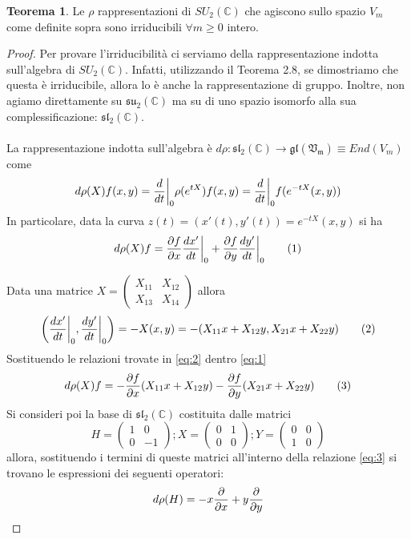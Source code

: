 \documentclass[12pt,a4paper]{report}
\theoremstyle{definition}
\newtheorem{Theo}[Def]{Teorema}
\theoremstyle{definition}
\theoremstyle{definition}
\theoremstyle{remark}
\begin{document}
\begin{Theo} \label{Theo1}
	Le $\rho$ rappresentazioni di $SU_2(\mathbb{C})$ che agiscono sullo spazio $V_m$ come definite sopra sono irriducibili $\forall m\geq 0$ intero.
\end{Theo}
\begin{proof}
	Per provare l'irriducibilità ci serviamo della rappresentazione indotta sull'algebra di $SU_2(\mathbb{C})$. Infatti, utilizzando il Teorema 2.8, se dimostriamo che questa è irriducibile, allora lo è anche la rappresentazione di gruppo. Inoltre, non agiamo direttamente su $\mathfrak{su_2(\mathbb{C})}$ ma su di uno spazio isomorfo alla sua complessificazione: $\mathfrak{sl_2(\mathbb{C})}$.\\
	\\
	La rappresentazione indotta sull'algebra è $d\rho:\mathfrak{sl_2(\mathbb{C})}\rightarrow \mathfrak{gl(V_m)}\equiv End(V_m)$ come 
	$$d\rho(X)f(x,y)={d\over dt}\bigg{\rvert}_{0}\rho(e^{tX})f(x,y)={d\over dt}\bigg{\rvert}_{0}f(e^{-tX}(x,y))$$
	In particolare, data la curva $z(t)=(x'(t),y'(t))=e^{-tX}(x,y)$ si ha 
	\begin{equation}
		d\rho(X)f={\partial f\over \partial x}{dx'\over dt}\bigg{\rvert}_0+{\partial f\over \partial y}{dy'\over dt}\bigg{\rvert}_0 \label{eq:1} \tag{1}
	\end{equation}
	
	Data una matrice  
	$X=\begin{pmatrix}
		X_{11}&X_{12}\\
		X_{13}&X_{14}
	\end{pmatrix}$ allora 
\begin{equation}
	\bigg{(}{dx'\over dt}\bigg{\rvert}_0,{dy'\over dt}\bigg{\rvert}_0\bigg{)}=-X(x,y)=-(X_{11}x+X_{12}y,X_{21}x+X_{22}y)\label{eq:2} \tag{2}
\end{equation}
Sostituendo le relazioni trovate in \ref{eq:2} dentro \ref{eq:1}
\begin{equation}
d\rho(X)f=-{\partial f\over \partial x}(X_{11}x+X_{12}y)-{\partial f\over \partial y}(X_{21}x+X_{22}y) \label{eq:3} \tag{3}
\end{equation}
	Si consideri poi la base di $\mathfrak{sl_2(\mathbb{C})}$ costituita dalle matrici $$H=
	\begin{pmatrix}
		1&0\\
		0&-1
	\end{pmatrix}; 
	X=\begin{pmatrix}
		0&1\\
		0&0
	\end{pmatrix};
	Y=\begin{pmatrix}
		0&0\\
		1&0
	\end{pmatrix}$$ allora, sostituendo i termini di queste matrici all'interno della relazione \ref{eq:3} si trovano le espressioni dei seguenti operatori:
\begin{equation*}
	d\rho(H)=-x{\partial\over\partial x}+y{\partial\over\partial y}
\end{equation*}


\end{proof}
\end{document}
